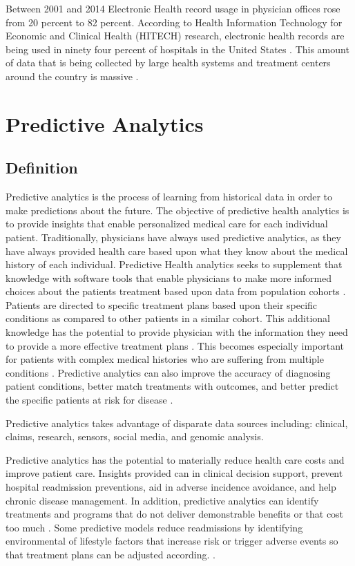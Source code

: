 \documentclass[sigconf]{acmart}
\begin{document}
Between 2001 and 2014 Electronic Health record usage in physician offices rose from 20 percent to 82 percent.  According to Health Information Technology for Economic and Clinical Health (HITECH) research, electronic health records are being used in ninety four percent of hospitals in the United States \cite{www-google-datapine}.  This amount of data that is being collected by large health systems and treatment centers around the country is massive \cite{www-google-pred}. 

\section{Predictive Analytics}

\subsection{Definition}

Predictive analytics is the process of learning from historical data in order to make predictions about the future. The objective of predictive health analytics is to provide insights that enable personalized medical care for each individual patient. Traditionally, physicians have always used predictive analytics, as they have always provided health care based upon what they know about the medical history of each individual. Predictive Health analytics seeks to supplement that knowledge with software tools that enable physicians to make more informed choices about the patients treatment based upon data from population cohorts \cite{www-google-pred}.  Patients are directed to specific treatment plans based upon their specific conditions as compared to other patients in a similar cohort.  This additional knowledge has the potential to provide physician with the information they need to provide a more effective treatment plans \cite{www-google-pred}. This becomes especially important for patients with complex medical histories who are suffering from multiple conditions \cite{www-google-datapine}.  Predictive analytics can also improve the accuracy of diagnosing patient conditions, better match treatments with outcomes, and better predict the specific patients at risk for disease \cite{www-google-datapine}.

Predictive analytics takes advantage of disparate data sources including: clinical, claims, research, sensors, social media, and genomic analysis.  

Predictive analytics has the potential to materially reduce health care costs and improve patient care.   Insights provided can in clinical decision support, prevent hospital readmission preventions, aid in adverse incidence avoidance, and help chronic disease management. In addition, predictive analytics can identify treatments and programs that do not deliver demonstrable benefits or that cost too much \cite{springer}. Some predictive models reduce readmissions by identifying environmental of lifestyle factors that increase risk or trigger adverse events so that treatment plans can be adjusted according. \cite{springer}. 
\end{document}
